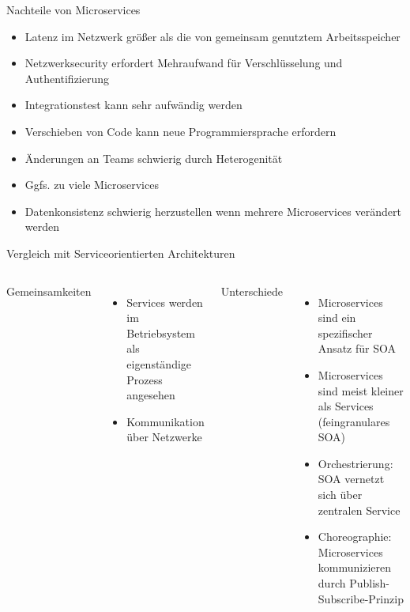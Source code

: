 \begin{frame}{Nachteile von Microservices}
	\begin{itemize}
		\item Latenz im Netzwerk größer als die von gemeinsam genutztem Arbeitsspeicher
		\item Netzwerksecurity erfordert Mehraufwand für Verschlüsselung und Authentifizierung
		\item Integrationstest kann sehr aufwändig werden
		\pause
		\item Verschieben von Code kann neue Programmiersprache erfordern
		\item Änderungen an Teams schwierig durch Heterogenität
		\item Ggfs. zu viele Microservices
		\item Datenkonsistenz schwierig herzustellen wenn mehrere Microservices verändert werden
	\end{itemize}
\end{frame}

\begin{frame}{Vergleich mit Serviceorientierten Architekturen}
	\begin{columns}[t]
		Gemeinsamkeiten
		\begin{itemize}
			\item Services werden im Betriebsystem als eigenständige Prozess angesehen
			\item Kommunikation über Netzwerke
		\end{itemize}
		Unterschiede
		\begin{itemize}
			\item Microservices sind ein spezifischer Ansatz für SOA
			\item Microservices sind meist kleiner als Services (feingranulares SOA)
			\item Orchestrierung: SOA vernetzt sich über zentralen Service
			\item Choreographie: Microservices kommunizieren durch Publish-Subscribe-Prinzip
		\end{itemize}
	\end{columns}
\end{frame}

